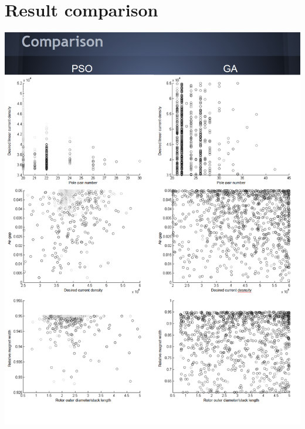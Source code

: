 \documentclass[twoside]{article}
\begin{document}
\section{Result comparison}
\includegraphics[width=\textwidth,height=\textheight,keepaspectratio]{results1.png}
\newpage
\end{document}
